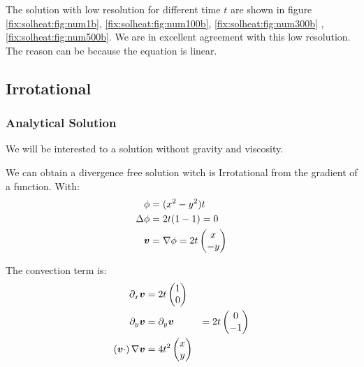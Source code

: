 The solution with low resolution for different time $t$ are shown in figure \ref{fix:solheat:fig:num1b}, \ref{fix:solheat:fig:num100b}, \ref{fix:solheat:fig:num300b} ,\ref{fix:solheat:fig:num500b}.
We are in excellent agreement with this low resolution. The reason can be because the equation is linear. 


\FloatBarrier
\subsection{Irrotational}

\subsubsection{Analytical Solution}

We will be interested to a solution without gravity and viscosity.


We can obtain a divergence free solution witch is Irrotational from the gradient of a function.
With:
\begin{align}
	\phi&=(x^2-y^2)t\\
	\Delta \phi &=2t(1-1)=0\\
	{\boldsymbol {v}}&=\nabla \phi=2t\begin{pmatrix}
	               	x\\
	               	-y
	               \end{pmatrix}
\end{align}

The convection term is:
\begin{align}
	\partial_{x}{\boldsymbol {v}}&=2t\begin{pmatrix}
	                        	1\\
	                        	0
	                        \end{pmatrix}\\
	\partial_{y}{\boldsymbol {v}}&=\partial_{y}{\boldsymbol {v}}&=2t\begin{pmatrix}
	                        	0\\
	                        	-1
	                        \end{pmatrix}\\
 \left({\boldsymbol {v}}\cdot\right) \nabla {\boldsymbol {v}}&=4t^2\begin{pmatrix}
                                                 	x\\
                                                 	y
                                                 \end{pmatrix}
\end{align}

